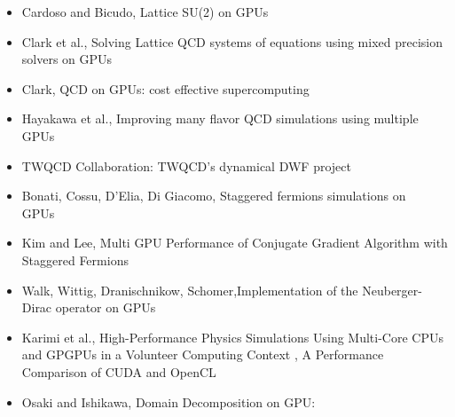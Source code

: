 \documentclass[a4paper,11pt]{article}
\begin{document}
\begin{itemize}
\item Cardoso and Bicudo, Lattice SU(2) on GPUs \cite{Cardoso:2010me}
\item Clark et al., Solving Lattice QCD systems of equations using mixed precision solvers on GPUs \cite{Clark:2009wm}
\item Clark, QCD on GPUs: cost effective supercomputing \cite{Clark:2009qp}
\item Hayakawa et al., Improving many flavor QCD simulations using multiple GPUs \cite{Hayakawa:2010gm}
\item TWQCD Collaboration: TWQCD's dynamical DWF project \cite{Chiu:2009wh}
\item Bonati, Cossu, D'Elia, Di Giacomo, Staggered fermions simulations on GPUs~\cite{Bonati:2010qu}
\item Kim and Lee, Multi GPU Performance of Conjugate Gradient Algorithm with Staggered Fermions \cite{Kim:2010br}
\item Walk, Wittig, Dranischnikow, Schomer,Implementation of the Neuberger-Dirac operator on GPUs \cite{Walk:2010ut}
\item Karimi et al., High-Performance Physics Simulations Using Multi-Core CPUs and GPGPUs in a Volunteer Computing Context \cite{DBLP:journals/corr/abs-1004-0023}, A Performance Comparison of CUDA and OpenCL \cite{DBLP:journals/corr/abs-1005-2581}
\item Osaki and Ishikawa, Domain Decomposition on GPU: \cite{osaki:2010}
\end{itemize}



\end{document}
